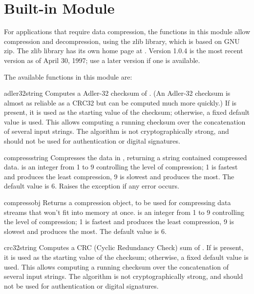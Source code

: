 \section{Built-in Module }
\label{module-zlib}

For applications that require data compression, the functions in this
module allow compression and decompression, using the zlib library,
which is based on GNU zip.  The zlib library has its own home page at
.
Version 1.0.4 is the most recent version as of April 30, 1997; use a
later version if one is available.

The available functions in this module are:

\renewcommand{\indexsubitem}{(in module zlib)}
\begin{funcdesc}{adler32}{string}
   Computes a Adler-32 checksum of .  (An Adler-32
   checksum is almost as reliable as a CRC32 but can be computed much
   more quickly.)  If  is present, it is used as the
   starting value of the checksum; otherwise, a fixed default value is
   used.  This allows computing a running checksum over the
   concatenation of several input strings.  The algorithm is not
   cryptographically strong, and should not be used for
   authentication or digital signatures.
\end{funcdesc}

\begin{funcdesc}{compress}{string}
Compresses the data in , returning a string contained
compressed data.   is an integer from 1 to 9 controlling
the level of compression; 1 is fastest and produces the least
compression, 9 is slowest and produces the most.  The default value is
6.  Raises the  exception if any error occurs.
\end{funcdesc}

\begin{funcdesc}{compressobj}{}
Returns a compression object, to be used for compressing data streams
  that won't fit into memory at once.   is an integer from
  1 to 9 controlling the level of compression; 1 is fastest and
  produces the least compression, 9 is slowest and produces the most.
  The default value is 6.
\end{funcdesc}

\begin{funcdesc}{crc32}{string}
   Computes a CRC (Cyclic Redundancy Check) sum of . If
    is present, it is used as the starting value of the
   checksum; otherwise, a fixed default value is used.  This allows
   computing a running checksum over the concatenation of several
   input strings.  The algorithm is not cryptographically strong, and
   should not be used for authentication or digital signatures.
\end{funcdesc}

